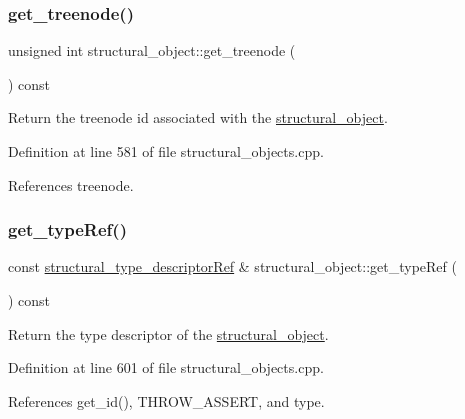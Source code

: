 \subsubsection{\texorpdfstring{get\+\_\+treenode()}{get\_treenode()}}
{\footnotesize\ttfamily unsigned int structural\+\_\+object\+::get\+\_\+treenode (\begin{DoxyParamCaption}{ }\end{DoxyParamCaption}) const}



Return the treenode id associated with the \hyperlink{classstructural__object}{structural\+\_\+object}. 



Definition at line 581 of file structural\+\_\+objects.\+cpp.



References treenode.

\mbox{\label{classstructural__object_ad2a7fb5dd4d4010876959da82af4f459}} 
\subsubsection{\texorpdfstring{get\+\_\+type\+Ref()}{get\_typeRef()}}
{\footnotesize\ttfamily const \hyperlink{structural__objects_8hpp_a219296792577e3292783725961506c83}{structural\+\_\+type\+\_\+descriptor\+Ref} \& structural\+\_\+object\+::get\+\_\+type\+Ref (\begin{DoxyParamCaption}{ }\end{DoxyParamCaption}) const}



Return the type descriptor of the \hyperlink{classstructural__object}{structural\+\_\+object}. 



Definition at line 601 of file structural\+\_\+objects.\+cpp.



References get\+\_\+id(), T\+H\+R\+O\+W\+\_\+\+A\+S\+S\+E\+RT, and type.




